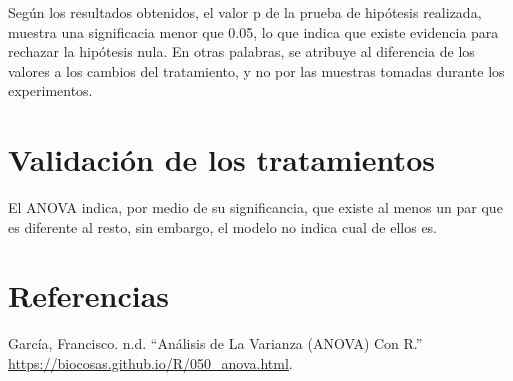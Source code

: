 \documentclass[]{article}
\begin{document}
Según los resultados obtenidos, el valor p de la prueba de hipótesis
realizada, muestra una significacia menor que 0.05, lo que indica que
existe evidencia para rechazar la hipótesis nula. En otras palabras, se
atribuye al diferencia de los valores a los cambios del tratamiento, y
no por las muestras tomadas durante los experimentos.

\section{Validación de los
tratamientos}\label{validacion-de-los-tratamientos}

El ANOVA indica, por medio de su significancia, que existe al menos un
par que es diferente al resto, sin embargo, el modelo no indica cual de
ellos es.

\section*{Referencias}\label{referencias}

\hypertarget{refs}{}
\hypertarget{ref-anova-r}{}
García, Francisco. n.d. ``Análisis de La Varianza (ANOVA) Con R.''
\url{https://biocosas.github.io/R/050_anova.html}.
\end{document}
